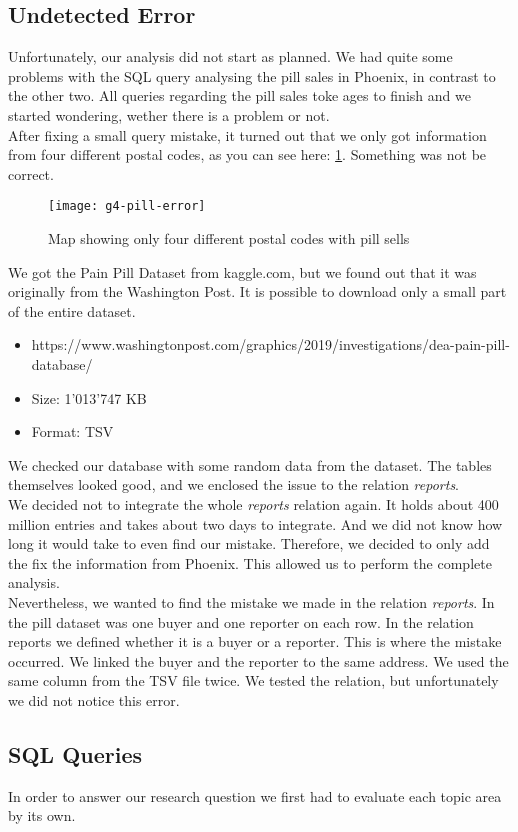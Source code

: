 \subsection*{Undetected Error}
Unfortunately, our analysis did not start as planned. We had quite some problems with the SQL query analysing the pill sales in Phoenix, in contrast to the other two. All queries regarding the pill sales toke ages to finish and we started wondering, wether there is a problem or not.\\
After fixing a small query mistake, it turned out that we only got information from four different postal codes, as you can see here: \ref{fig:pillError}. Something was not be correct.
\begin{figure}[H]
    \centering
    \texttt{[image: g4-pill-error]}
    \caption{Map showing only four different postal codes with pill sells}
    \label{fig:pillError}
\end{figure}
We got the Pain Pill Dataset from kaggle.com, but we found out that it was originally from the Washington Post. It is possible to download only a small part of the entire dataset.
\begin{itemize}
	\item https://www.washingtonpost.com/graphics/2019/investigations/dea-pain-pill-database/
	\item Size: 1'013'747 KB
	\item Format: TSV
\end{itemize}
We checked our database with some random data from the dataset. The tables themselves looked good, and we enclosed the issue to the relation \textit{reports}. \\
We decided not to integrate the whole \textit{reports} relation again. It holds about 400 million entries and takes about two days to integrate. And we did not know how long it would take to even find our mistake. Therefore, we decided to only add the fix the information from Phoenix. This allowed us to perform the complete analysis.\\
Nevertheless, we wanted to find the mistake we made in the relation \textit{reports}. In the pill dataset was one buyer and one reporter on each row. In the relation reports we defined whether it is a buyer or a reporter. This is where the mistake occurred. We linked the buyer and the reporter to the same address. We used the same column from the TSV file twice. We tested the relation, but unfortunately we did not notice this error.


\subsection*{SQL Queries}
In order to answer our research question we first had to evaluate each topic area by its own.
